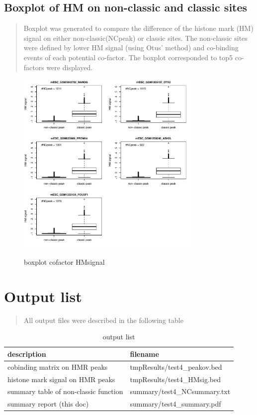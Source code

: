 \documentclass[11pt,a4paper]{article}
\begin{document}
\subsection{Boxplot of HM on non-classic and classic sites}
\begin{quotation}
Boxplot was generated to compare the difference of the histone mark (HM) signal on either non-classic(NCpeak) or classic sites. The non-classic sites were defined by lower HM signal (using Otus' method) and co-binding events of each potential co-factor. The boxplot corresponded to top5 co-factors were displayed.  
\end{quotation}
\begin{figure}[h]
        \caption{boxplot cofactor HMsignal} \label{fig:profileunion}
        \setlength{\abovecaptionskip}{0pt}
        \setlength{\belowcaptionskip}{10pt}
        \centering
        {\includegraphics[width=0.8\textwidth]{test4_coTF_HMsignal.pdf}}
\end{figure}

\newpage
\newpage
\section{Output list}
\begin{quotation}
All output files were described in the following table
\end{quotation}
\begin{table}[h]
\caption{output list}\label{bstable}
\begin{tabularx}{\textwidth}{ |X|l| }
    
\hline
description & filename \\
\hline
cobinding matrix on HMR peaks & tmpResults/test4\_peakov.bed \\
\hline
histone mark signal on HMR peaks & tmpResults/test4\_HMsig.bed \\
\hline
summary table of non-classic function & summary/test4\_NCsummary.txt \\
\hline
summary report (this doc) & summary/test4\_summary.pdf \\
\hline

\end{tabularx}
\end{table} 
\end{document}
